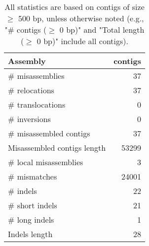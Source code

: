 \documentclass[12pt,a4paper]{article}
\begin{document}
\begin{table}[ht]
\begin{center}
\caption{All statistics are based on contigs of size $\geq$ 500 bp, unless otherwise noted (e.g., "\# contigs ($\geq$ 0 bp)" and "Total length ($\geq$ 0 bp)" include all contigs).}
\begin{tabular}{|l*{1}{|r}|}
\hline
Assembly & contigs \\ \hline
\# misassemblies & 37 \\ \hline
\hspace{5mm}\# relocations & 37 \\ \hline
\hspace{5mm}\# translocations & 0 \\ \hline
\hspace{5mm}\# inversions & 0 \\ \hline
\# misassembled contigs & 37 \\ \hline
Misassembled contigs length & 53299 \\ \hline
\# local misassemblies & 3 \\ \hline
\# mismatches & 24001 \\ \hline
\# indels & 22 \\ \hline
\hspace{5mm}\# short indels & 21 \\ \hline
\hspace{5mm}\# long indels & 1 \\ \hline
Indels length & 28 \\ \hline
\end{tabular}
\end{center}
\end{table}
\end{document}

